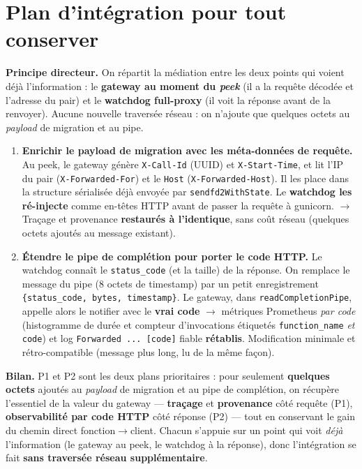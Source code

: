 \documentclass[10pt,a4paper]{article}
\newcommand{\code}[1]{\texttt{\small #1}}
\begin{document}
\section{Plan d'intégration pour tout conserver}

\textbf{Principe directeur.} On répartit la médiation entre les deux points qui voient déjà
l'information : le \textbf{gateway au moment du \emph{peek}} (il a la requête décodée et l'adresse du
pair) et le \textbf{watchdog full-proxy} (il voit la réponse avant de la renvoyer). Aucune nouvelle
traversée réseau : on n'ajoute que quelques octets au \emph{payload} de migration et au pipe.

\begin{enumerate}[label=\textbf{P\arabic*.}]
\item \textbf{Enrichir le payload de migration avec les méta-données de requête.}
Au peek, le gateway génère \code{X-Call-Id} (UUID) et \code{X-Start-Time}, et lit l'IP du pair
(\code{X-Forwarded-For}) et le \code{Host} (\code{X-Forwarded-Host}). Il les place dans la structure
sérialisée déjà envoyée par \code{sendfd2WithState}. Le \textbf{watchdog les ré-injecte} comme en-têtes
HTTP avant de passer la requête à gunicorn. $\rightarrow$ Traçage et provenance \textbf{restaurés à l'identique},
sans coût réseau (quelques octets ajoutés au message existant).

\item \textbf{Étendre le pipe de complétion pour porter le code HTTP.}
Le watchdog connaît le \code{status\_code} (et la taille) de la réponse. On remplace le message du pipe
(8 octets de timestamp) par un petit enregistrement \code{\{status\_code, bytes, timestamp\}}. Le gateway,
dans \code{readCompletionPipe}, appelle alors le notifier avec le \textbf{vrai code} $\rightarrow$ métriques
Prometheus \emph{par code} (histogramme de durée et compteur d'invocations étiquetés
\code{function\_name} \emph{et} \code{code}) et log \code{Forwarded ... [code]} fiable \textbf{rétablis}.
Modification minimale et rétro-compatible (message plus long, lu de la même façon).
\end{enumerate}

\textbf{Bilan.} P1 et P2 sont les deux plans prioritaires : pour seulement \textbf{quelques octets}
ajoutés au \emph{payload} de migration et au pipe de complétion, on récupère l'essentiel de la valeur du
gateway --- \textbf{traçage} et \textbf{provenance} côté requête (P1), \textbf{observabilité par code HTTP}
côté réponse (P2) --- tout en conservant le gain du chemin direct fonction$\rightarrow$client. Chacun
s'appuie sur un point qui voit \emph{déjà} l'information (le gateway au peek, le watchdog à la réponse),
donc l'intégration se fait \textbf{sans traversée réseau supplémentaire}.
\end{document}

